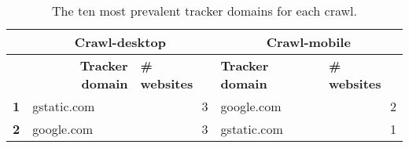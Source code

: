 \begin{table}[ht] 
\caption{The ten most prevalent tracker domains for each crawl.} 
\centering 
\begin{tabular}{|l|ll|ll|} 
\hline\textbf{} & \multicolumn{2}{c|}{\textbf{Crawl-desktop}} & \multicolumn{2}{c|}{\textbf{Crawl-mobile}} \\ \hline 
& \multicolumn{1}{r|}{\textbf{Tracker domain}} & \textbf{\# websites} & \multicolumn{1}{l|}{\textbf{Tracker domain}} & \textbf{\# websites} \\ \hline 
\textbf{1} & \multicolumn{1}{l|}{gstatic.com} & \multicolumn{1}{r|}{3} & \multicolumn{1}{l|}{google.com} & \multicolumn{1}{r|}{2} \\ \hline 
\textbf{2} & \multicolumn{1}{l|}{google.com} & \multicolumn{1}{r|}{3} & \multicolumn{1}{l|}{gstatic.com} & \multicolumn{1}{r|}{1} \\ \hline 
\end{tabular} 
\label{tab:TrackerTop10} 
\end{table}